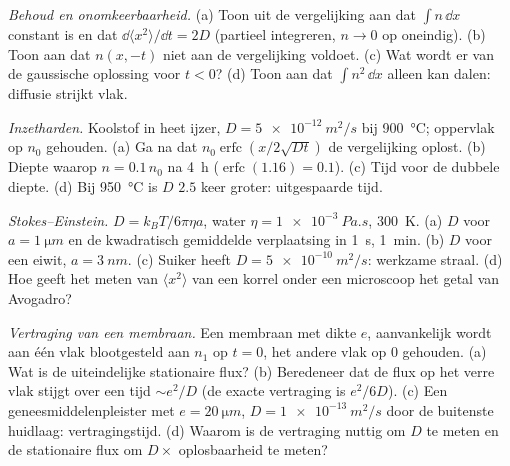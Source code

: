 \begin{exercise}[$\star\star$]\label{exo:b2:particle-diffusion:7}
\emph{Behoud en onomkeerbaarheid.} (a) Toon uit de vergelijking aan
dat $\int n\,\dd x$ constant is en dat $\dd\langle x^2\rangle/\dd t =
2D$
(partieel integreren, $n \to 0$ op oneindig). (b) Toon aan dat
$n(x,-t)$ niet aan de vergelijking voldoet. (c) Wat wordt er van de
gaussische oplossing voor $t < 0$? (d) Toon aan dat $\int n^2\,\dd x$ alleen kan
dalen: diffusie strijkt vlak.
\end{exercise}

\begin{exercise}[$\star\star$]\label{exo:b2:particle-diffusion:8}
\emph{Inzetharden.} Koolstof in heet ijzer, $D = \qty{5e-12}{m^2/s}$ bij
\qty{900}{\celsius}; oppervlak op $n_0$ gehouden. (a) Ga na dat
$n_0
\operatorname{erfc}(x/2\sqrt{Dt})$ de vergelijking oplost. (b) Diepte
waarop
$n = 0.1\,n_0$ na \qty{4}{h} ($\operatorname{erfc}(1.16) = 0.1$).
(c) Tijd voor de dubbele diepte. (d) Bij \qty{950}{\celsius} is $D$ $2.5$
keer groter: uitgespaarde tijd.
\end{exercise}

\begin{exercise}[$\star\star$]\label{exo:b2:particle-diffusion:9}
\emph{Stokes--Einstein.} $D = k_BT/6\pi\eta a$, water
$\eta =
\qty{1e-3}{Pa.s}$, \qty{300}{K}. (a) $D$ voor
$a = \qty{1}{\micro m}$ en
de kwadratisch gemiddelde verplaatsing in \qty{1}{s}, \qty{1}{min}. (b) $D$
voor een eiwit, $a = \qty{3}{nm}$. (c) Suiker heeft $D = \qty{5e-10}{m^2/s}$:
werkzame straal. (d) Hoe geeft het meten van $\langle x^2\rangle$ van een korrel
onder een microscoop het getal van Avogadro?
\end{exercise}

\begin{exercise}[$\star\star\star$]\label{exo:b2:particle-diffusion:10}
\emph{Vertraging van een membraan.} Een membraan met dikte $e$, aanvankelijk
wordt aan één vlak blootgesteld aan $n_1$ op $t = 0$, het andere vlak op
$0$ gehouden. (a) Wat is de uiteindelijke stationaire flux? (b) Beredeneer
dat de flux
op het verre vlak stijgt over een tijd $\sim e^2/D$ (de exacte vertraging is
$e^2/6D$). (c) Een geneesmiddelenpleister met $e = \qty{20}{\micro m}$,
$D =
\qty{1e-13}{m^2/s}$ door de buitenste huidlaag: vertragingstijd. (d)
Waarom
is de vertraging nuttig om $D$ te meten en de stationaire flux om
$D \times$ oplosbaarheid te meten?
\end{exercise}

